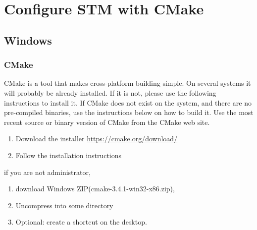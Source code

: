 \chapter{Configure STM with CMake}
\section{Windows}
\subsection{CMake}
CMake is a tool that makes cross-platform building simple. On several systems it will probably be already installed. If it is not, please use the following instructions to install it. If CMake does not exist on the system, and there are no pre-compiled binaries, use the instructions below on how to build it. Use the most recent source or binary version of CMake from the CMake web site.
\begin{enumerate}\item Download the installer \url{https://cmake.org/download/} \item Follow the installation instructions \end{enumerate}
 if you are not administrator, \begin{enumerate} \item download Windows ZIP(cmake-3.4.1-win32-x86.zip), \item Uncompress into some directory \item Optional: create a shortcut on the desktop.\end{enumerate}
